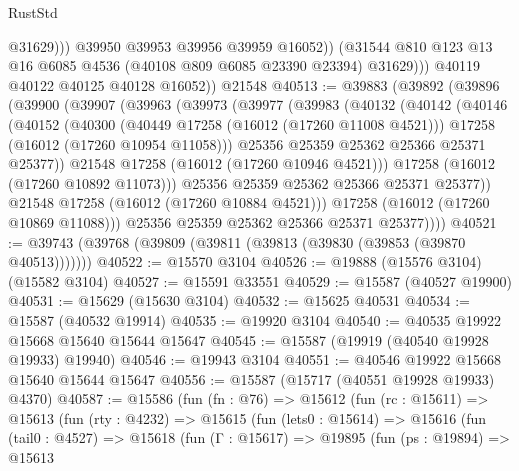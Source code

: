 \begin{lexlean}{RustStd}
\begin{coremodule}
                      @31629)))
                @39950
                @39953
                @39956
                @39959
                @16052))
            (@31544 @810 @123 @13 @16 @6085 @4536 (@40108 @809 @6085 @23390 @23394) @31629)))
        @40119
        @40122
        @40125
        @40128
        @16052))
    @21548
@40513 := @39883
    (@39892
      (@39896
        (@39900
          (@39907
            (@39963
              (@39973
                (@39977
                  (@39983
                    (@40132
                      (@40142
                        (@40146
                          (@40152
                            (@40300
                              (@40449 @17258 (@16012 (@17260 @11008 @4521)))
                              @17258
                              (@16012 (@17260 @10954 @11058)))
                            @25356
                            @25359
                            @25362
                            @25366
                            @25371
                            @25377))
                        @21548
                        @17258
                        (@16012 (@17260 @10946 @4521)))
                      @17258
                      (@16012 (@17260 @10892 @11073)))
                    @25356
                    @25359
                    @25362
                    @25366
                    @25371
                    @25377))
                @21548
                @17258
                (@16012 (@17260 @10884 @4521)))
              @17258
              (@16012 (@17260 @10869 @11088)))
            @25356
            @25359
            @25362
            @25366
            @25371
            @25377))))
@40521 := @39743 (@39768 (@39809 (@39811 (@39813 (@39830 (@39853 (@39870 @40513)))))))
@40522 := @15570 @3104
@40526 := @19888 (@15576 @3104) (@15582 @3104)
@40527 := @15591 @33551
@40529 := @15587 (@40527 @19900)
@40531 := @15629 (@15630 @3104)
@40532 := @15625 @40531
@40534 := @15587 (@40532 @19914)
@40535 := @19920 @3104
@40540 := @40535 @19922 @15668 @15640 @15644 @15647
@40545 := @15587 (@19919 (@40540 @19928 @19933) @19940)
@40546 := @19943 @3104
@40551 := @40546 @19922 @15668 @15640 @15644 @15647
@40556 := @15587 (@15717 (@40551 @19928 @19933) @4370)
@40587 := @15586
    (fun (fn : @76) =>
    @15612
      (fun (rc : @15611) =>
      @15613
        (fun (rty : @4232) =>
        @15615
          (fun (lets0 : @15614) =>
          @15616
            (fun (tail0 : @4527) =>
            @15618
              (fun (Γ : @15617) =>
              @19895
                (fun (ps : @19894) =>
                @15613

\end{coremodule}
\end{lexlean}
